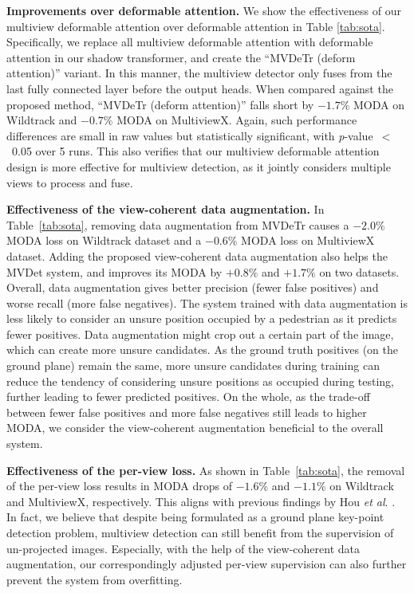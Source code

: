 \documentclass[sigconf,authorversion,nonacm]{acmart}
\newcommand{\etal}{\textit{et al}. }
\begin{document}
\textbf{Improvements over deformable attention.}
We show the effectiveness of our multiview deformable attention over deformable attention \cite{zhu2021deformable} in Table \ref{tab:sota}. Specifically, we replace all multiview deformable attention with deformable attention in our shadow transformer, and create the ``MVDeTr (deform attention)'' variant. In this manner, the multiview detector only fuses from the last fully connected layer before the output heads. 
When compared against the proposed method, ``MVDeTr (deform attention)'' falls short by $-1.7\%$  MODA on Wildtrack and $-0.7\%$ MODA on MultiviewX. Again, such performance differences are small in raw values but statistically significant, with \textit{p}-value~$<$~0.05 over 5 runs. 
This also verifies that our multiview deformable attention design is more effective for multiview detection, as it jointly considers multiple views to process and fuse.




\textbf{Effectiveness of the view-coherent data augmentation.}
In Table~\ref{tab:sota}, removing data augmentation from MVDeTr causes a $-2.0\%$ MODA loss on Wildtrack dataset and a $-0.6\%$ MODA loss on MultiviewX dataset. 
Adding the proposed view-coherent data augmentation also helps the MVDet system, and improves its MODA by $+0.8\%$ and $+1.7\%$ on two datasets. 
Overall, data augmentation gives better precision (fewer false positives) and worse recall (more false negatives). The system trained with data augmentation is less likely to consider an unsure position occupied by a pedestrian as it predicts fewer positives. Data augmentation might crop out a certain part of the image, which can create more unsure candidates. As the ground truth positives (on the ground plane) remain the same, more unsure candidates during training can reduce the tendency of considering unsure positions as occupied during testing, further leading to fewer predicted positives. On the whole, as the trade-off between fewer false positives and more false negatives still leads to higher MODA, we consider the view-coherent augmentation beneficial to the overall system.







\textbf{Effectiveness of the per-view loss.}
As shown in Table~\ref{tab:sota}, the removal of the per-view loss results in MODA drops of $-1.6\%$ and $-1.1\%$ on Wildtrack and MultiviewX, respectively. This aligns with previous findings by Hou \etal \cite{hou2020multiview}. In fact, we believe that despite being formulated as a ground plane key-point detection problem, multiview detection can still benefit from the supervision of un-projected images. Especially, with the help of the view-coherent data augmentation, our correspondingly adjusted per-view supervision can also further prevent the system from overfitting. 
\end{document}
